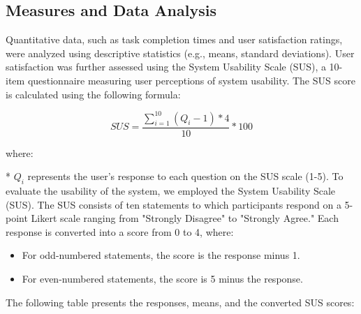 \documentclass[conference]{IEEEtran}
\begin{document}
\subsection{Measures and Data Analysis}
Quantitative data, such as task completion times and user satisfaction ratings, were analyzed using descriptive statistics (e.g., means, standard deviations). User satisfaction was further assessed using the System Usability Scale (SUS), a 10-item questionnaire measuring user perceptions of system usability. The SUS score is calculated using the following formula:

\begin{equation*}
SUS = \frac{\sum_{i=1}^{10} (Q_i - 1) * 4}{10} * 100
\end{equation*}

where:

* $Q_i$ represents the user's response to each question on the SUS scale (1-5).
To evaluate the usability of the system, we employed the System Usability Scale (SUS). The SUS consists of ten statements to which participants respond on a 5-point Likert scale ranging from "Strongly Disagree" to "Strongly Agree." Each response is converted into a score from 0 to 4, where:

\begin{itemize}
    \item For odd-numbered statements, the score is the response minus 1.
    \item For even-numbered statements, the score is 5 minus the response.
\end{itemize}

The following table presents the responses, means, and the converted SUS scores:
\end{document}
